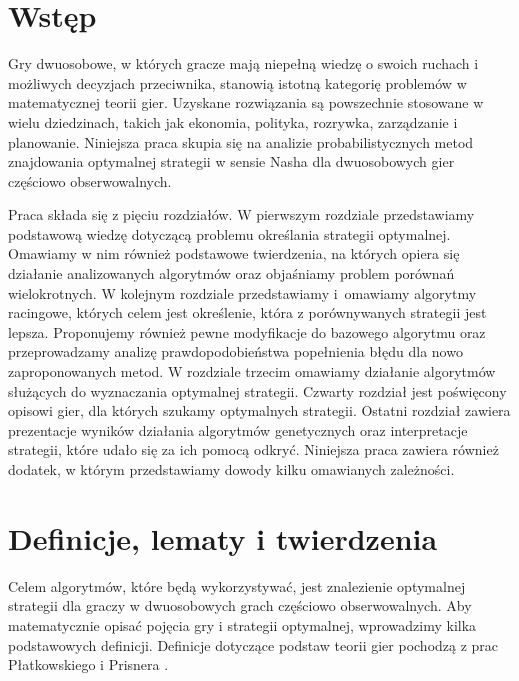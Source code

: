 \documentclass[inzynierska]{pwr_wmat_praca_dyplomowa}
\theoremstyle{plain}
\numberwithin{theorem}{chapter}
\theoremstyle{definition}
\numberwithin{theorem}{chapter}
\begin{document}
\frontmatter
\maketitle
\mainmatter
\tableofcontents
{\backmatter \chapter{Wstęp}} 
Gry dwuosobowe, w których gracze mają niepełną wiedzę o swoich ruchach i możliwych decyzjach przeciwnika, stanowią istotną kategorię problemów w matematycznej teorii gier. Uzyskane rozwiązania są powszechnie stosowane w wielu dziedzinach, takich jak ekonomia, polityka, rozrywka, zarządzanie i planowanie.
Niniejsza praca skupia się na analizie probabilistycznych metod znajdowania optymalnej strategii w sensie Nasha \cite{Von_Stengel_2002} dla dwuosobowych gier częściowo obserwowalnych.

Praca składa się z pięciu rozdziałów. W pierwszym rozdziale przedstawiamy podstawową wiedzę dotyczącą problemu określania strategii optymalnej. Omawiamy w nim również podstawowe twierdzenia, na których opiera się działanie analizowanych algorytmów oraz objaśniamy problem porównań wielokrotnych. W kolejnym rozdziale przedstawiamy i~omawiamy algorytmy racingowe, których celem jest określenie, która z porównywanych strategii jest lepsza. Proponujemy również pewne modyfikacje do bazowego algorytmu oraz przeprowadzamy analizę prawdopodobieństwa popełnienia błędu dla nowo zaproponowanych metod. W rozdziale trzecim omawiamy działanie algorytmów służących do wyznaczania optymalnej strategii. Czwarty rozdział jest poświęcony opisowi gier, dla których szukamy optymalnych strategii. Ostatni rozdział zawiera prezentacje wyników działania algorytmów genetycznych oraz interpretacje strategii, które udało się za ich pomocą odkryć.
Niniejsza praca zawiera również dodatek, w którym  przedstawiamy dowody kilku omawianych zależności.

\chapter{Definicje, lematy i twierdzenia}
Celem algorytmów, które będą wykorzystywać, jest znalezienie optymalnej strategii dla graczy w dwuosobowych grach częściowo obserwowalnych. Aby matematycznie opisać pojęcia gry i strategii optymalnej, wprowadzimy kilka podstawowych definicji.
Definicje dotyczące podstaw teorii gier pochodzą z prac Płatkowskiego \cite{platkowski2012wstkep} i Prisnera \cite{prisner2014game}.
\end{document}
